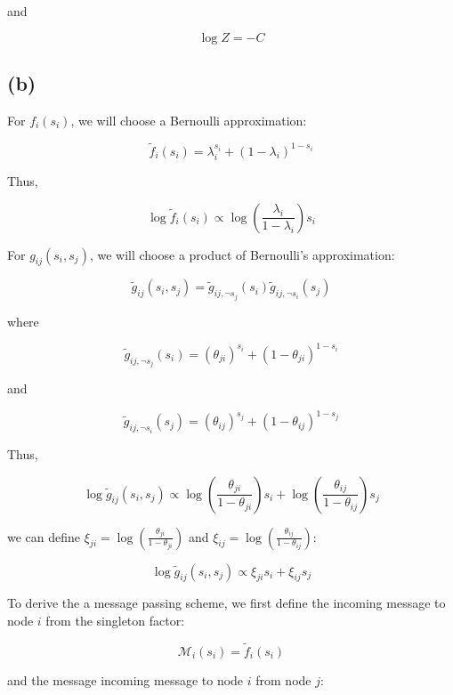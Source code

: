 \documentclass[12pt]{article}
\begin{document}
and

\[\log Z = -C \]


\subsection*{(b)}

For $f_i(s_i)$, we will choose a Bernoulli approximation:

\[\tilde{f}_i(s_i) = \lambda_i^{s_i} + (1-\lambda_i)^{1-s_i}\]


Thus,

\[\log \tilde{f}_i(s_i) \propto \log \left(\frac{\lambda_i}{1-\lambda_i} \right)s_i\]

For $g_{ij}(s_i, s_j)$, we will choose a product of Bernoulli's approximation:

\[\tilde{g}_{ij}(s_i, s_j) = \tilde{g}_{ij, \neg s_j}(s_i)\tilde{g}_{ij, \neg s_i}(s_j)\]

where

\[\tilde{g}_{ij, \neg s_j}(s_i) = (\theta_{ji})^{s_i} + (1-\theta_{ji})^{1-s_i}\]

and

\[\tilde{g}_{ij, \neg s_i}(s_j) = (\theta_{ij})^{s_j} + (1-\theta_{ij})^{1-s_j}\]

Thus,

\[\log \tilde{g}_{ij}(s_i, s_j) \propto \log \left(\frac{\theta_{ji}}{1-\theta_{ji}} \right) s_i + \log \left(\frac{\theta_{ij}}{1-\theta_{ij}} \right) s_j\]

we can define $\xi_{ji} = \log \left(\frac{\theta_{ji}}{1-\theta_{ji}} \right)$ and $\xi_{ij} = \log \left(\frac{\theta_{ij}}{1-\theta_{ij}} \right)$:

\[\log \tilde{g}_{ij}(s_i, s_j) \propto \xi_{ji} s_i + \xi_{ij} s_j\]


To derive the a message passing scheme, we first define the incoming message to node $i$ from the singleton factor:

\[\mathcal{M}_{i}(s_i) = \tilde{f}_i(s_i)\]

and the message incoming message to node $i$ from node $j$:


\end{document}

